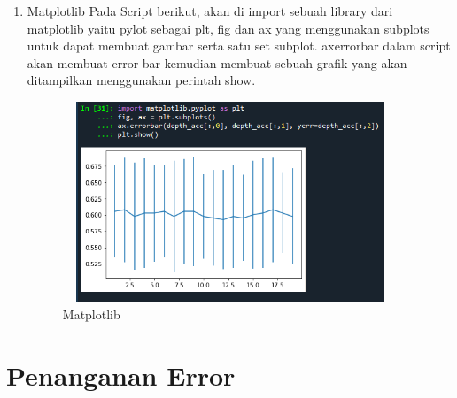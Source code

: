 \begin{enumerate}
\item Matplotlib
\newline Pada Script berikut, akan di import sebuah library dari matplotlib yaitu pylot sebagai plt, fig dan ax yang menggunakan subplots untuk dapat membuat gambar serta satu set subplot. axerrorbar dalam script akan membuat error bar kemudian membuat sebuah grafik yang akan ditampilkan menggunakan perintah show.
\begin{figure}[!htbp]
	\centering
	\includegraphics[width=10cm,height=6cm]{figures/matplotlib.png}
	\caption{Matplotlib}
	\label{penanda}
\end{figure}
\end{enumerate}

\section{Penanganan Error}
